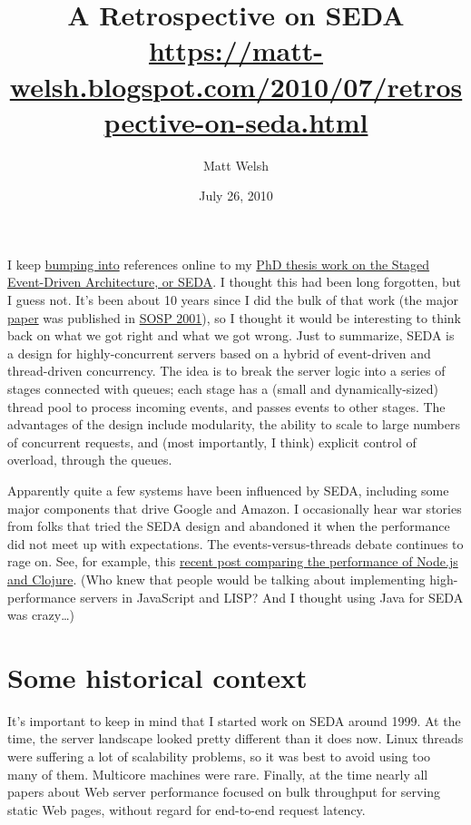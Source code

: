 \documentclass[a4paper,12pt,notitlepage,twoside,openright]{article}
\title{A Retrospective on SEDA\\\scriptsize \url{https://matt-welsh.blogspot.com/2010/07/retrospective-on-seda.html}}
\author{Matt Welsh}
\date{July 26, 2010}
\begin{document}
\maketitle

I keep \href{http://news.ycombinator.com/item?id=399670}{bumping into} references online to my \href{http://www.eecs.harvard.edu/~mdw/proj/seda/}{PhD thesis work on the Staged Event-Driven Architecture, or SEDA}. I thought this had been long forgotten, but I guess not. It's been about 10 years since I did the bulk of that work (the major \href{http://www.eecs.harvard.edu/~mdw/papers/seda-sosp01.pdf}{paper} was published in \href{http://sosp.org/2001/}{SOSP 2001}), so I thought it would be interesting to think back on what we got right and what we got wrong. Just to summarize, SEDA is a design for highly-concurrent servers based on a hybrid of event-driven and thread-driven concurrency. The idea is to break the server logic into a series of stages connected with queues; each stage has a (small and dynamically-sized) thread pool to process incoming events, and passes events to other stages. The advantages of the design include modularity, the ability to scale to large numbers of concurrent requests, and (most importantly, I think) explicit control of overload, through the queues.

Apparently quite a few systems have been influenced by SEDA, including some major components that drive Google and Amazon. I occasionally hear war stories from folks that tried the SEDA design and abandoned it when the performance did not meet up with expectations. The events-versus-threads debate continues to rage on. See, for example, this \href{http://dosync.posterous.com/clojure-nodejs-and-why-messaging-can-be-lame}{recent post comparing the performance of Node.js and Clojure}. (Who knew that people would be talking about implementing high-performance servers in JavaScript and LISP? And I thought using Java for SEDA was crazy\ldots)

\section{Some historical context}

It's important to keep in mind that I started work on SEDA around 1999. At the time, the server landscape looked pretty different than it does now. Linux threads were suffering a lot of scalability problems, so it was best to avoid using too many of them. Multicore machines were rare. Finally, at the time nearly all papers about Web server performance focused on bulk throughput for serving static Web pages, without regard for end-to-end request latency.
\end{document}
